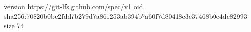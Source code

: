 version https://git-lfs.github.com/spec/v1
oid sha256:70820b0be2fdd7b279d7a861253ab394b7a60f7d80418c3c37468b0e4dc82993
size 74

